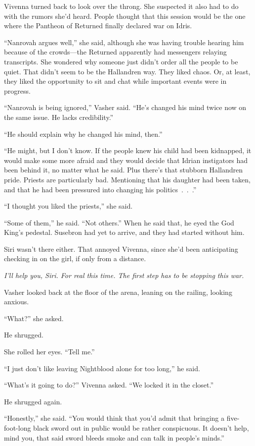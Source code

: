 Vivenna turned back to look over the throng. She suspected it also had to do with the rumors she’d heard. People thought that this session would be the one where the Pantheon of Returned finally declared war on Idris.

“Nanrovah argues well,” she said, although she was having trouble hearing him because of the crowds—the Returned apparently had messengers relaying transcripts. She wondered why someone just didn’t order all the people to be quiet. That didn’t seem to be the Hallandren way. They liked chaos. Or, at least, they liked the opportunity to sit and chat while important events were in progress.

“Nanrovah is being ignored,” Vasher said. “He’s changed his mind twice now on the same issue. He lacks credibility.”

“He should explain why he changed his mind, then.”

“He might, but I don’t know. If the people knew his child had been kidnapped, it would make some more afraid and they would decide that Idrian instigators had been behind it, no matter what he said. Plus there’s that stubborn Hallandren pride. Priests are particularly bad. Mentioning that his daughter had been taken, and that he had been pressured into changing his politics~.~.~.”

“I thought you liked the priests,” she said.

“Some of them,” he said. “Not others.” When he said that, he eyed the God King’s pedestal. Susebron had yet to arrive, and they had started without him.

Siri wasn’t there either. That annoyed Vivenna, since she’d been anticipating checking in on the girl, if only from a distance.

\textit{I’ll help you, Siri. For real this time. The first step has to be stopping this war.}

Vasher looked back at the floor of the arena, leaning on the railing, looking anxious.

“What?” she asked.

He shrugged.

She rolled her eyes. “Tell me.”

“I just don’t like leaving Nightblood alone for too long,” he said.

“What’s it going to do?” Vivenna asked. “We locked it in the closet.”

He shrugged again.

“Honestly,” she said. “You would think that you’d admit that bringing a five-foot-long black sword out in public would be rather conspicuous. It doesn’t help, mind you, that said sword bleeds smoke and can talk in people’s minds.”

